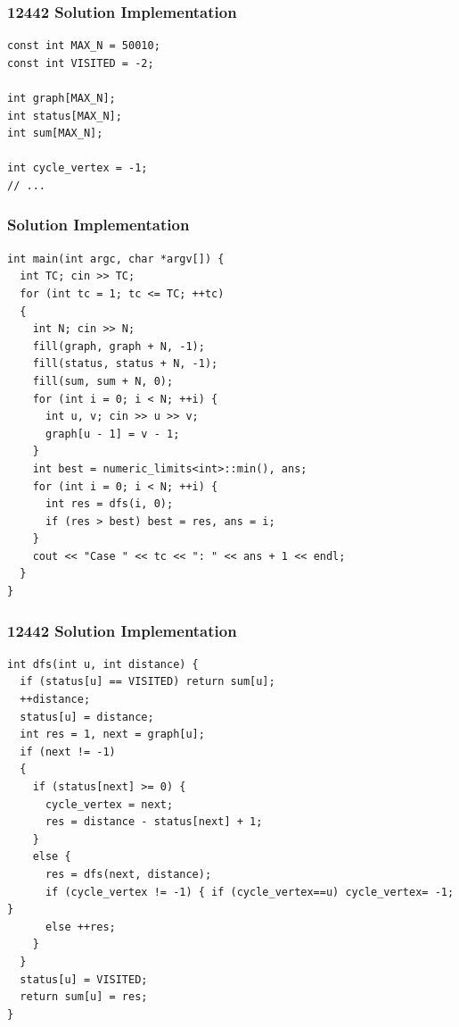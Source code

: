 \documentclass{beamer}
\begin{document}
\begin{frame}[containsverbatim]
\frametitle{12442 Solution Implementation}

\scriptsize
\begin{lstlisting}
const int MAX_N = 50010;
const int VISITED = -2;

int graph[MAX_N];
int status[MAX_N];
int sum[MAX_N];

int cycle_vertex = -1;
// ...
\end{lstlisting}

\end{frame}

\begin{frame}[containsverbatim]
\frametitle{Solution Implementation}

\scriptsize
\begin{lstlisting}
int main(int argc, char *argv[]) {
  int TC; cin >> TC;
  for (int tc = 1; tc <= TC; ++tc)
  {
    int N; cin >> N;
    fill(graph, graph + N, -1);
    fill(status, status + N, -1);
    fill(sum, sum + N, 0);
    for (int i = 0; i < N; ++i) {
      int u, v; cin >> u >> v;
      graph[u - 1] = v - 1;
    }
    int best = numeric_limits<int>::min(), ans;
    for (int i = 0; i < N; ++i) {
      int res = dfs(i, 0);
      if (res > best) best = res, ans = i;
    }
    cout << "Case " << tc << ": " << ans + 1 << endl;
  }
}
\end{lstlisting}

\end{frame}

\begin{frame}[containsverbatim]
\frametitle{12442 Solution Implementation}

\scriptsize
\begin{lstlisting}
int dfs(int u, int distance) {
  if (status[u] == VISITED) return sum[u];
  ++distance;
  status[u] = distance;
  int res = 1, next = graph[u];
  if (next != -1)
  {
    if (status[next] >= 0) {
      cycle_vertex = next;
      res = distance - status[next] + 1;
    }
    else {
      res = dfs(next, distance);
      if (cycle_vertex != -1) { if (cycle_vertex==u) cycle_vertex= -1; }
      else ++res;
    }
  }
  status[u] = VISITED;
  return sum[u] = res;
}
\end{lstlisting}

\end{frame}

\fi
\end{document}
